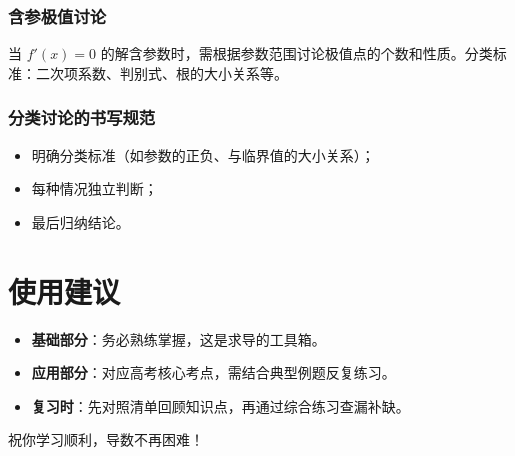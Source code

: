 \documentclass[10pt]{article}
\begin{document}
\subsubsection{含参极值讨论}
当 $f'(x)=0$ 的解含参数时，需根据参数范围讨论极值点的个数和性质。分类标准：二次项系数、判别式、根的大小关系等。

\subsubsection{分类讨论的书写规范}
\begin{itemize}
    \item 明确分类标准（如参数的正负、与临界值的大小关系）；
    \item 每种情况独立判断；
    \item 最后归纳结论。
\end{itemize}

\section*{使用建议}
\begin{itemize}
    \item \textbf{基础部分}：务必熟练掌握，这是求导的工具箱。
    \item \textbf{应用部分}：对应高考核心考点，需结合典型例题反复练习。
    \item \textbf{复习时}：先对照清单回顾知识点，再通过综合练习查漏补缺。
\end{itemize}

\vspace{1cm}
\begin{center}
    \large 祝你学习顺利，导数不再困难！
\end{center}
\end{document}
